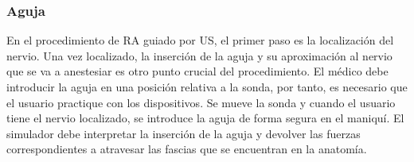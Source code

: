 




\subsubsection{Aguja}

En el procedimiento de \ac{RA} guiado por \ac{US}, el primer paso es la localización del nervio. Una vez localizado, la inserción de la aguja y su aproximación al nervio que se va a anestesiar es otro punto crucial del procedimiento. El médico debe introducir la aguja en una posición relativa a la sonda, por tanto, es necesario que el usuario practique con los dispositivos. Se mueve la sonda y cuando el usuario tiene el nervio localizado, se introduce la aguja de forma segura en el maniquí. El simulador debe interpretar la inserción de la aguja y devolver las fuerzas correspondientes a atravesar las fascias que se encuentran en la anatomía. 

